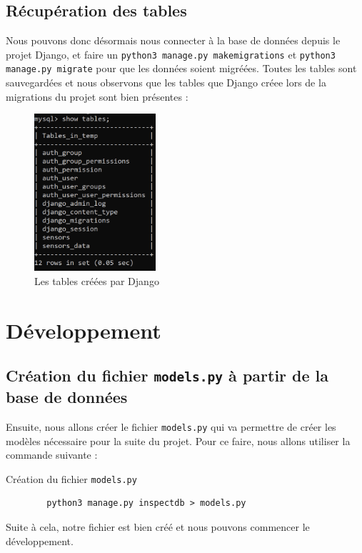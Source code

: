 \documentclass[12pt, a4paper]{article}
\begin{document}
	\subsection{Récupération des tables}

	Nous pouvons donc désormais nous connecter à la base de données
	depuis le projet Django, et faire un \texttt{python3 manage.py makemigrations} 
	et \texttt{python3 manage.py migrate} pour que les données soient migréées. 
	Toutes les tables sont sauvegardées et nous observons que les tables que Django
	créee lors de la migrations du projet sont bien présentes :
	\begin{figure}[H]
		\centering
		\includegraphics[width=0.4\textwidth]{../img/tables.png}
		\caption{Les tables créées par Django}
		\label{fig:tables}
	\end{figure}
	\newpage
	\section{Développement}
	\subsection{Création du fichier \texttt{models.py} à partir de la base de données}
	Ensuite, nous allons créer le fichier \texttt{models.py} qui va permettre de créer les modèles 
	nécessaire pour la suite du projet. Pour ce faire, nous allons utiliser la commande suivante :
	\begin{listing}[H]
		\caption{Création du fichier \texttt{models.py}}
		\label{lst:models}
		\begin{verbatim}
		python3 manage.py inspectdb > models.py 
		\end{verbatim}
	\end{listing}
	Suite à cela, notre fichier est bien créé et nous pouvons commencer le développement.\\[0.5cm]
\end{document}
